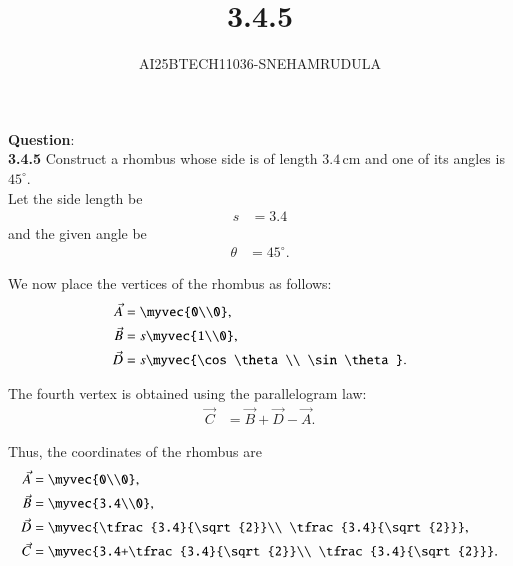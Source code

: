 \documentclass[journal]{IEEEtran}
\begin{document}

\vspace{3cm}

\title{3.4.5}
\author{AI25BTECH11036-SNEHAMRUDULA}
 \maketitle
{\let\newpage\relax\maketitle}
\renewcommand{\thefigure}{\theenumi}
\renewcommand{\thetable}{\theenumi}
\setlength{\intextsep}{10pt} 
\renewcommand{\thetable}{\theenumi}
\textbf{Question}:\\
\textbf{3.4.5} Construct a rhombus whose side is of length $3.4 \, \text{cm}$ and one of its angles is $45^\circ$.
\solution \\
Let the side length be 
\begin{align}
    s &= 3.4                                            \label{eq:rhomb1}
\end{align}
and the given angle be
\begin{align}
    \theta &= 45^\circ.                                 \label{eq:rhomb2}
\end{align}

\noindent
We now place the vertices of the rhombus as follows:
\begin{align}
    \vec{A} &= \myvec{0\\0},                            \label{eq:rhombA}\\
    \vec{B} &= s\myvec{1\\0},                           \label{eq:rhombB}\\
    \vec{D} &= s\myvec{\cos\theta\\ \sin\theta}.        \label{eq:rhombD}
\end{align}

\noindent
The fourth vertex is obtained using the parallelogram law:
\begin{align}
    \vec{C} &= \vec{B} + \vec{D} - \vec{A}.             \label{eq:rhombC}
\end{align}

\noindent
Thus, the coordinates of the rhombus are
\begin{align}
    \vec{A} &= \myvec{0\\0},                            \label{eq:rhombA2}\\
    \vec{B} &= \myvec{3.4\\0},                          \label{eq:rhombB2}\\
    \vec{D} &= \myvec{\tfrac{3.4}{\sqrt{2}}\\ \tfrac{3.4}{\sqrt{2}}}, 
                                                      \label{eq:rhombD2}\\
    \vec{C} &= \myvec{3.4+\tfrac{3.4}{\sqrt{2}}\\ \tfrac{3.4}{\sqrt{2}}}.
                                                      \label{eq:rhombC2}
\end{align}
\end{document}
